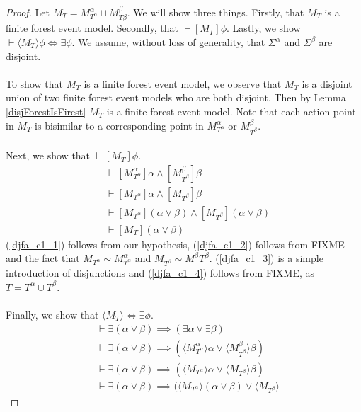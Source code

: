 \documentclass[12pt, a4paper, titlepage]{scrartcl}
\numberwithin{equation}{section}
\newcommand{\sqex}[1]{[{#1}]}
\newcommand{\anex}[1]{\langle {#1} \rangle}
\begin{document}
\begin{proof}
Let $M_T = M^\alpha_{T^\alpha} \sqcup M^\beta_{T\beta}$.
We will show three things.
Firstly, that $M_T$ is a finite forest event model.
Secondly, that $\vdash \sqex{M_T}\phi$.
Lastly, we show $\vdash \anex{ M_T } \phi \iff \exists \phi$.
We assume, without loss of generality, that $\Sigma^\alpha$ and $\Sigma^\beta$ are disjoint.\\
\\
To show that $M_T$ is a finite forest event model, we observe that $M_T$ is a disjoint union of two
finite forest event models who are both disjoint.
Then by Lemma \ref{disjForestIsFirest} $M_T$ is a finite forest event model.
Note that each action point in $M_T$ is bisimilar to a corresponding point in $M^\alpha_{T^\alpha}$ or
$M^\beta_{T^\beta}$.\\
\\
Next, we show that $\vdash \sqex{M_T}\phi$.
\begin{align}
	&\vdash \sqex{M^\alpha_{T^\alpha}}\alpha \land \sqex{M^\beta_{T^\beta}}\beta \label{djfa_c1_1}\\
	&\vdash \sqex{M_{T^\alpha}}\alpha \land \sqex{M_{T^\beta}}\beta \label{djfa_c1_2}\\
	&\vdash \sqex{M_{T^\alpha}}(\alpha \lor \beta) \land \sqex{M_{T^\beta}}(\alpha \lor \beta) \label{djfa_c1_3} \\
	&\vdash \sqex{M_T}(\alpha \lor \beta) \label{djfa_c1_4}
\end{align}
(\ref{djfa_c1_1}) follows from our hypothesis, (\ref{djfa_c1_2}) follows from FIXME and the fact that
$M_{T^\alpha} \sim M^\alpha_{T^\alpha}$ and $M_{T^\beta} \sim M^\beta{T^\beta}$.
(\ref{djfa_c1_3}) is a simple introduction of disjunctions and (\ref{djfa_c1_4}) follows from FIXME, as
$T = T^\alpha \cup T^\beta$.\\
\\
Finally, we show that $\anex{M_T} \iff \exists \phi$.
\begin{align}
	&\vdash \exists (\alpha \lor \beta) \implies (\exists \alpha \lor \exists \beta) \label{djfa_c2_1} \\
	&\vdash \exists (\alpha \lor \beta) \implies (\anex{ M^\alpha_{T^\alpha} } \alpha \lor
			\anex{ M^\beta_{T^\beta} }\beta) \label{djfa_c2_2}\\
	&\vdash \exists (\alpha \lor \beta) \implies (\anex{M_{T^\alpha}} \alpha \lor \anex{M_{T^\beta}}
			\beta)\label{djfa_c2_3}\\
	&\vdash \exists (\alpha \lor \beta) \implies (\anex{M_{T^\alpha}} (\alpha \lor \beta) \lor \anex{M_{T^\beta}}

\end{align}
\end{proof}
\end{document}
